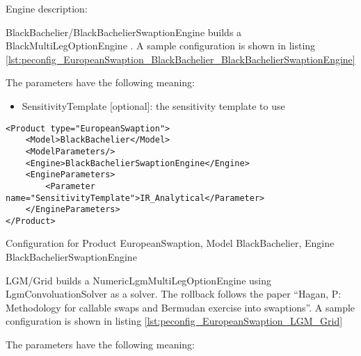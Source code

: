 Engine description:

BlackBachelier/BlackBachelierSwaptionEngine builds a BlackMultiLegOptionEngine . A sample configuration is shown in
listing \ref{lst:peconfig_EuropeanSwaption_BlackBachelier_BlackBachelierSwaptionEngine}

The parameters have the following meaning:

\begin{itemize}
\item SensitivityTemplate [optional]: the sensitivity template to use 
\end{itemize}

\begin{longlisting}
\begin{verbatim}
<Product type="EuropeanSwaption">
    <Model>BlackBachelier</Model>
    <ModelParameters/>
    <Engine>BlackBachelierSwaptionEngine</Engine>
    <EngineParameters>
        <Parameter name="SensitivityTemplate">IR_Analytical</Parameter>
    </EngineParameters>
</Product>
\end{verbatim}
\caption{Configuration for Product EuropeanSwaption, Model BlackBachelier, Engine BlackBachelierSwaptionEngine}
\label{lst:peconfig_EuropeanSwaption_BlackBachelier_BlackBachelierSwaptionEngine}
\end{longlisting}

LGM/Grid builds a NumericLgmMultiLegOptionEngine using LgmConvoluationSolver as a solver. The rollback follows the paper
``Hagan, P: Methodology for callable swaps and Bermudan exercise into swaptions''. A sample configuration is shown in
listing \ref{lst:peconfig_EuropeanSwaption_LGM_Grid}

The parameters have the following meaning:

